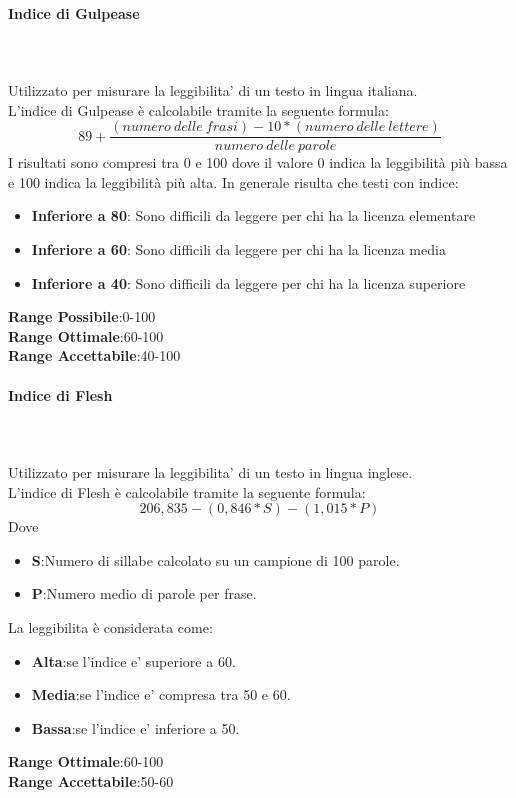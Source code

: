 \paragraph{Indice di Gulpease}~\\ ~\\
Utilizzato per misurare la leggibilita' di un testo in lingua italiana.\\
L'indice di Gulpease è calcolabile tramite la seguente formula:
$$
	89+\frac{(numero\:delle\:frasi)-10*(numero\:delle\:lettere)}{numero\:delle\:parole}
$$
I risultati sono compresi tra 0 e 100 dove il valore 0 indica la leggibilità più bassa e 100 indica la leggibilità più alta. In generale risulta che testi con indice:
	\begin{itemize}
		\item{\textbf{Inferiore	a 80}}: Sono difficili da leggere per chi ha la licenza elementare
		\item{\textbf{Inferiore	a 60}}: Sono difficili da leggere per chi ha la licenza media
		\item{\textbf{Inferiore	a 40}}: Sono difficili da leggere per chi ha la licenza superiore
	\end{itemize}
\textbf{Range Possibile}:0-100 \\	
\textbf{Range Ottimale}:60-100 \\
\textbf{Range Accettabile}:40-100
\paragraph{Indice di Flesh}~\\ ~\\
Utilizzato per misurare la leggibilita' di un testo in lingua inglese.\\
L'indice di Flesh è calcolabile tramite la seguente formula:
	$$
		206,835-(0,846*S)-(1,015*P)
	$$
Dove
	\begin{itemize}
		\item{\textbf{S}}:Numero di sillabe calcolato su un campione di 100 parole.
		\item{\textbf{P}}:Numero medio di parole per frase.
	\end{itemize}
La leggibilita è considerata come:
	\begin{itemize}
		\item{\textbf{Alta}}:se l'indice e' superiore a 60.
		\item{\textbf{Media}}:se l'indice e' compresa tra 50 e 60.
		\item{\textbf{Bassa}}:se l'indice e' inferiore a 50.
	\end{itemize}
\textbf{Range Ottimale}:60-100 \\
\textbf{Range Accettabile}:50-60
